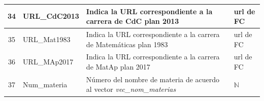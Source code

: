 {\begin{longtable}{|c|l|p{7.5cm}|p{3.5cm}|}
\hline 
34 & URL\_CdC2013 & Indica la URL correspondiente a la carrera de CdC plan 2013 & url de FC \\ 
\hline 
35 & URL\_Mat1983 & Indica la URL correspondiente a la carrera de Matemáticas plan 1983 & url de FC \\ 
\hline 
36 & URL\_MAp2017 & Indica la URL correspondiente a la carrera de MatAp plan 2017 & url de FC \\ 
\hline 
37 & Num\_materia & Número del nombre de materia de acuerdo al vector \textit{vec\_nom\_materias} & $\mathbb{N}$ \\ 
\hline 
\end{longtable}}







\renewcommand\lstlistingname{Código} %
\renewcommand\lstlistlistingname{Códigos} %

